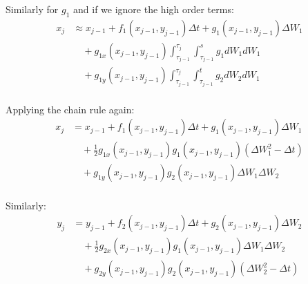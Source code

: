 \begin{frame}
Similarly for $g_1$ and if we ignore the high order terms:
	\begin{equation*}
	\begin{split}
	x_{j} & \approx x_{j-1}+f_1(x_{j-1},y_{j-1})\Delta t+g_1(x_{j-1},y_{j-1})\Delta W_1\\
	& \quad +g_{1x}(x_{j-1},y_{j-1})\int_{\tau_{j-1}}^{\tau_{j}}
	\int_{\tau_{j-1}}^{s}g_1dW_1dW_1\\
	& \quad	+g_{1y}(x_{j-1},y_{j-1})\int_{\tau_{j-1}}^{\tau_{j}}\int_{\tau_{j-1}}^{t}
	g_2dW_2dW_1\\
	\end{split}
	\end{equation*}	
\end{frame}


\begin{frame}
Applying the chain rule again:
	\begin{equation*}
	\begin{split}
	x_{j} &= x_{j-1}+f_1(x_{j-1},y_{j-1})\Delta t+g_1(x_{j-1},y_{j-1})\Delta W_1\\
	&\quad +\frac{1}{2}g_{1x}(x_{j-1},y_{j-1})g_{1}(x_{j-1},y_{j-1})(\Delta W_1^2-\Delta t)\\
	&\quad +g_{1y}(x_{j-1},y_{j-1})g_2(x_{j-1},y_{j-1})\Delta W_1 \Delta W_2\\
	\end{split}
	\end{equation*}
\end{frame}

\begin{frame}
Similarly:
\begin{equation*}
	\begin{split}
	y_{j}&=y_{j-1}+f_2(x_{j-1},y_{j-1})\Delta t+g_2(x_{j-1},y_{j-1})\Delta W_2\\
	&\quad +\frac{1}{2}g_{2x}(x_{j-1},y_{j-1})g_{1}(x_{j-1},y_{j-1})\Delta W_1 \Delta W_2\\
	&\quad +g_{2y}(x_{j-1},y_{j-1})g_2(x_{j-1},y_{j-1})(\Delta W_2^2-\Delta t)\\
	\end{split}
	\end{equation*}
\end{frame}




